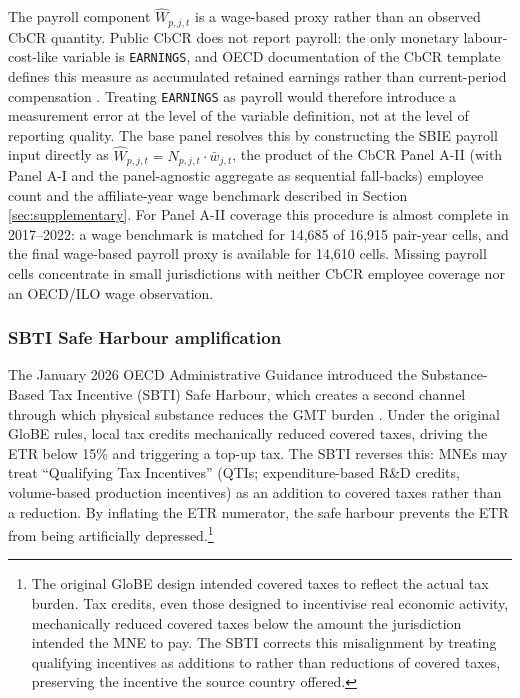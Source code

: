 \documentclass[11pt,a4paper]{article}
\newcommand{\code}[1]{\texttt{#1}}
\begin{document}
The payroll component $\hat{W}_{p,j,t}$ is a wage-based proxy rather than an observed CbCR quantity.\label{sec:payroll_imputation} Public CbCR does not report payroll: the only monetary labour-cost-like variable is \code{EARNINGS}, and OECD documentation of the CbCR template defines this measure as accumulated retained earnings rather than current-period compensation \citep{oecd2025a}. Treating \code{EARNINGS} as payroll would therefore introduce a measurement error at the level of the variable definition, not at the level of reporting quality. The base panel resolves this by constructing the SBIE payroll input directly as $\hat{W}_{p,j,t} = N_{p,j,t} \cdot \bar{w}_{j,t}$, the product of the CbCR Panel A-II (with Panel A-I and the panel-agnostic aggregate as sequential fall-backs) employee count and the affiliate-year wage benchmark described in Section \ref{sec:supplementary}. For Panel A-II coverage this procedure is almost complete in 2017--2022: a wage benchmark is matched for 14{,}685 of 16{,}915 pair-year cells, and the final wage-based payroll proxy is available for 14{,}610 cells. Missing payroll cells concentrate in small jurisdictions with neither CbCR employee coverage nor an OECD/ILO wage observation.

\subsubsection{SBTI Safe Harbour amplification}\label{sec:sbti_amplification}\label{sec:sbti}

The January 2026 OECD Administrative Guidance introduced the Substance-Based Tax Incentive (SBTI) Safe Harbour, which creates a second channel through which physical substance reduces the GMT burden \citep{oecd2026}. Under the original GloBE rules, local tax credits mechanically reduced covered taxes, driving the ETR below 15\% and triggering a top-up tax. The SBTI reverses this: MNEs may treat ``Qualifying Tax Incentives'' (QTIs; expenditure-based R\&D credits, volume-based production incentives) as an addition to covered taxes rather than a reduction. By inflating the ETR numerator, the safe harbour prevents the ETR from being artificially depressed.\footnote{The original GloBE design intended covered taxes to reflect the actual tax burden. Tax credits, even those designed to incentivise real economic activity, mechanically reduced covered taxes below the amount the jurisdiction intended the MNE to pay. The SBTI corrects this misalignment by treating qualifying incentives as additions to rather than reductions of covered taxes, preserving the incentive the source country offered.}
\end{document}
